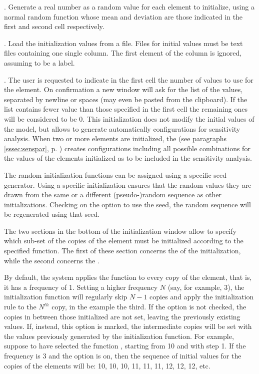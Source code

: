 \documentclass [11pt,a4paper] {book}
\begin{document}
. Generate a real number as a random value for each element to initialize, using a normal random function whose mean and deviation are those indicated in the first and second cell respectively.

. Load the initialization values from a file. Files for initial values must be text files containing one single column. The first element of the column is ignored, assuming to be a label.

. The user is requested to indicate in the first cell the number of values to use for the element. On confirmation a new window will ask for the list of the values, separated by newline or spaces (may even be pasted from the clipboard). If the list contains fewer value than those specified in the first cell the remaining ones will be considered to be 0. This initialization does not modify the initial values of the model, but allows to generate automatically configurations for sensitivity analysis. When two or more elements are initialized, the   (see paragraphs \ref{sssec:senspar}, p. \pageref{sssec:senspar}) creates configurations including all possible combinations for the values of the elements initialized as to be included in the sensitivity analysis.

\bigskip


The random initialization functions can be assigned using a specific seed generator. Using a specific initialization ensures that the random values they are drawn from the same or a different (pseudo-)random sequence as other initializations. Checking on the option to use the seed, the random sequence will be regenerated using that seed.

\bigskip

The two sections in the bottom of the initialization window allow to specify which sub-set of the copies of the element must be initialized according to the specified function. The first of these section concerns the  of the initialization, while the second concerns the . 

By default, the system applies the function to every copy of the element, that is, it has a frequency of 1. Setting a higher frequency $N$ (say, for example, 3), the initialization function will regularly skip $N-1$ copies and apply the initialization rule to the $N^{th}$ copy, in the example the third. If the option  is not checked, the copies in between those initialized are not set, leaving the previously existing values. If, instead, this option is marked, the intermediate copies will be set with the values previously generated by the initialization function. For example, suppose to have selected the function , starting from 10 and with step 1. If the frequency is 3 and the option  is on, then the sequence of initial values for the copies of the elements will be: 10, 10, 10, 11, 11, 11, 12, 12, 12, etc.
\end{document}
